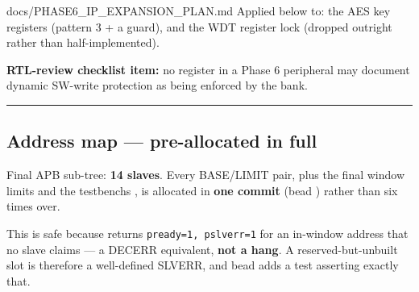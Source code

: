 \begin{relocated}{docs/PHASE6_IP_EXPANSION_PLAN.md}
Applied below to: the AES key registers (pattern 3 + a 
guard), and the WDT register lock (dropped outright rather than
half-implemented).

\textbf{RTL-review checklist item:} no register in a Phase 6 peripheral
may document dynamic SW-write protection as being enforced by the bank.

\begin{center}\rule{0.5\linewidth}{0.5pt}\end{center}

\subsection{Address map --- pre-allocated in full}\label{ds:ch:phase6-ip-expansion-plan:4-address-map-pre-allocated-in-full}

Final APB sub-tree: \textbf{14 slaves}. Every BASE/\allowbreak{}LIMIT
pair, plus the final window limits and the testbench\textquotesingle s
, is allocated in \textbf{one commit} (bead
) rather than six times over.

This is safe because  returns
\texttt{pready=\allowbreak{}1,\allowbreak{}\ pslverr=\allowbreak{}1} for
an in-window address that no slave claims --- a DECERR equivalent,
\textbf{not a hang}. A reserved-but-unbuilt slot is therefore a
well-defined SLVERR, and bead  adds a test asserting
exactly that.

{\small\setlength{\tabcolsep}{4pt}

}
\end{relocated}
